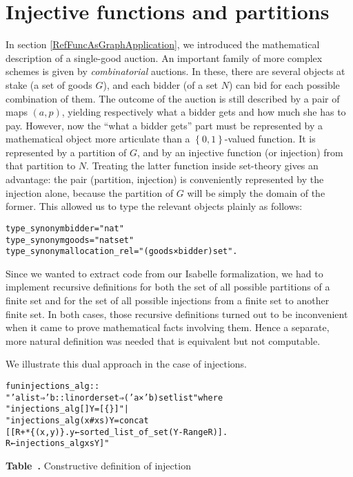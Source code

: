 \documentclass[
]{llncs}
\newenvironment{mytable}{
\vspace{0.2ex}
\begin{center}\begin{minipage}
{0.9\textwidth}\renewcommand{\baselinestretch}{0.75}\begin{small}}
{\end{small}\end{minipage}\end{center}
\vspace{0.1ex}
}
\newcommand{\mycaption}[1]{\refstepcounter{table}\centerline{\textbf{Table~\arabic{table}.} #1}}
\newcommand{\I}{Isabelle}
\begin{document}
\section{Injective functions and partitions}
\label{RefDualDefs}
In section \ref{RefFuncAsGraphApplication}, we introduced the mathematical description of a single-good auction.
An important family of more complex schemes is given by \emph{combinatorial} auctions.
In these, there are several objects at stake (a set of goods $G$), and each bidder (of a set $N$) can bid for each possible combination of them.
The outcome of the auction is still described by a pair of maps $\left( a, p \right)$, yielding respectively what a bidder gets and how much she has to pay.
However, now the ``what a bidder gets{}'' part must be represented by a mathematical object more articulate than a $\left\{ 0,1 \right\}$-valued function.
It is represented by a partition of $G$, and by an injective function (or injection) from that partition to $N$.
Treating the latter function inside set-theory gives an advantage: the pair (partition, injection) is conveniently represented by the injection alone, because the partition of $G$ will be simply the domain of the former.
This allowed us to type the relevant objects plainly as follows:
\begin{mytable}
\begin{alltt}
type_synonym bidder = "nat"
type_synonym goods = "nat set"
type_synonym allocation_rel = "(goods × bidder) set".
\end{alltt}
\end{mytable}

Since we wanted to extract code from our \I{} formalization, we had to implement recursive definitions for both the set of all possible partitions of a finite set and for the set of all possible injections from a finite set to another finite set.
In both cases, those recursive definitions turned out to be inconvenient when it came to prove mathematical facts involving them. Hence a separate, more natural definition was needed that is equivalent but not computable.

We illustrate this dual approach in the case of injections.
\begin{mytable}
\begin{alltt}
fun injections_alg :: 
"'a list ⇒ 'b::linorder set ⇒ ('a × 'b) set list" where 
"injections_alg [] Y = [\{\}]" |
"injections_alg (x # xs) Y = concat 
[[R+*\{(x,y)\}. y←sorted_list_of_set (Y-Range R)]. 
                          R ← injections_alg xs Y]"
\end{alltt}
\mycaption{Constructive definition of injection}\label{table:injective_alg}
\end{mytable}
\end{document}

